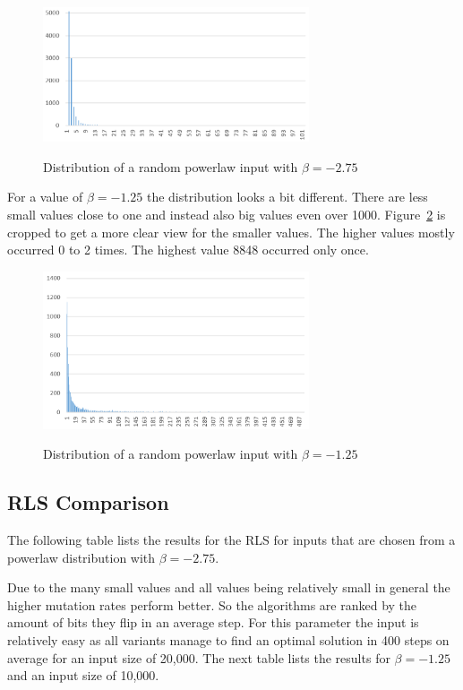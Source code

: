 \begin{figure}[h]
      \caption{Distribution of a random powerlaw input with $\beta=-2.75$}
      \centering
      \includegraphics[width=0.7\textwidth]{figures/images/numberGenerator/powerlaw_-2_75.png}\label{fig:powerDistExample1}
\end{figure}

For a value of $\beta=-1.25$ the distribution looks a bit different.
There are less small values close to one and instead also big values even over 1000.
Figure~\ref{fig:powerDistExample2} is cropped to get a more clear view for the smaller values.
The higher values mostly occurred 0 to 2 times.
The highest value 8848 occurred only once.

\begin{figure}[h]
      \caption{Distribution of a random powerlaw input with $\beta=-1.25$}
      \centering
      \includegraphics[width=0.7\textwidth]{figures/images/numberGenerator/powerlaw_-1_25.png}\label{fig:powerDistExample2}
\end{figure}
\subsection{RLS Comparison}
The following table lists the results for the RLS for inputs that are chosen from a powerlaw distribution with $\beta=-2.75$.




Due to the many small values and all values being relatively small in general the higher mutation rates perform better.
So the algorithms are ranked by the amount of bits they flip in an average step.
For this parameter the input is relatively easy as all variants manage to find an optimal solution in 400 steps on average for an input size of 20,000.
The next table lists the results for $\beta=-1.25$ and an input size of 10,000.

